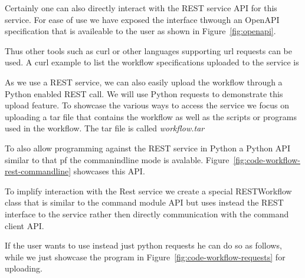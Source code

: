 Certainly one can also directly interact with the REST service API for
this service.  For ease of use we have exposed the interface thwough
an OpenAPI specification that is availeable to the user as shown in
Figure~\ref{fig:openapi}.



Thus other tools such as curl or other languages supporting url
requests can be used. A curl example to list the workflow
specifications uploaded to the service is

As we use a REST service, we can also easily upload the workflow
through a Python enabled REST call. We will use Python requests to
demonstrate this upload feature. To showcase the various ways to
access the service we focus on uploading a tar file that contains the workflow as well as the scripts or programs used in the workflow. The tar file is called {\em workflow.tar}

To also allow programming against the REST service in Python a Python
API similar to that pf the commanindline mode is
avalable. Figure~\ref{fig:code-workflow-rest-commandline} showcases
this API.

To implify interaction with the Rest service we create a special
RESTWorkflow class that is similar to the command module API but uses
instead the REST interface to the service rather then directly
communication with the command client API.

If the user wants to use instead just python requests he can do so as
follows, while we just showcase the program in
Figure~\ref{fig:code-workflow-requests} for uploading.

